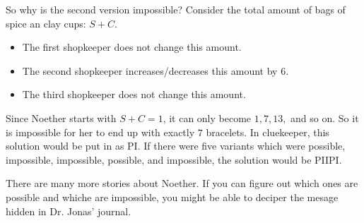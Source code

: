 So why is the second version impossible? Consider the total amount of bags of spice an clay cups: \(S + C\).
\begin{itemize}
  \item The first shopkeeper does not change this amount.
  \item The second shopkeeper increases/decreases this amount by 6.
  \item The third shopkeeper does not change this amount.
\end{itemize}
Since Noether starts with \(S + C = 1\), it can only become \(1, 7, 13,\) and so on.
So it is impossible for her to end up with exactly \(7\) bracelets.
In cluekeeper, this solution would be put in as PI.
If there were five variants which were possible, impossible, impossible, possible, and impossible, the solution would be PIIPI.

There are many more stories about Noether. If you can figure out which ones are possible and whiche are impossible, you might be able to deciper the mesage hidden in Dr. Jonas' journal.
